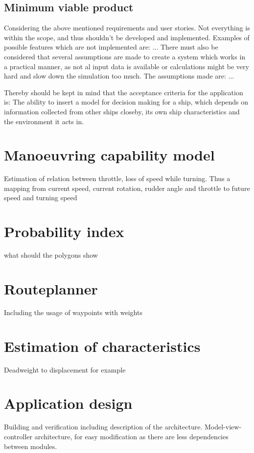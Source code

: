 \subsection{Minimum viable product}
Considering the above mentioned requirements and user stories. Not everything is within the scope, and thus shouldn't be developed and implemented. Examples of possible features which are not implemented are: ... 
There must also be considered that several assumptions are made to create a system which works in a practical manner, as not al input data is available or calculations might be very hard and slow down the simulation too much. The assumptions made are: ...

Thereby should be kept in mind that the acceptance criteria for the application is: The ability to insert a model for decision making for a ship, which depends on information collected from other ships closeby, its own ship characteristics and the environment it acts in.

\section{Manoeuvring capability model}
Estimation of relation between throttle, loss of speed while turning. Thus a mapping from current speed, current rotation, rudder angle and throttle to future speed and turning speed

\section{Probability index}
what should the polygons show

\section{Routeplanner}
Including the usage of waypoints with weights

\section{Estimation of characteristics}
Deadweight to displacement for example

\section{Application design}
Building and verification including description of the architecture. Model-view-controller architecture, for easy modification as there are less dependencies between modules.


